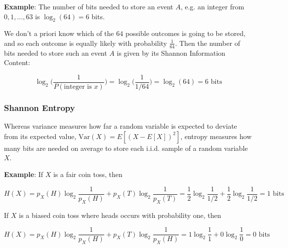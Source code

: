 \textbf{Example}: The number of bits needed to store an event $A$, e.g. an integer from $0, 1, \dots, 63$ is $\log_2(64) = 6$ bits.

We don't a priori know which of the $64$ possible outcomes is going to be stored, and so each outcome is equally likely with probability $\frac{1}{64}$. Then the number of bits needed to store such an event $A$ is given by its Shannon Information Content:

$$\log_2\Big( \frac{1}{P(\text{integer is } x)} \Big) = \log_2 \Big( \frac{1}{1 / 64} \Big) = \log_2(64) = 6 \text{ bits}$$

\subsubsection{Shannon Entropy}

Whereas variance measures how far a random variable is expected to deviate from its expected value, $\text{Var}(X) = E[(X - E[X])^2]$, entropy measures how many bits are needed on average to store each i.i.d. sample of a random variable $X$.


\textbf{Example}: If $X$ is a fair coin toss, then

$$H(X) = p_X(H) \log_2 \frac{1}{p_X(H)} + p_X(T) \log_2 \frac{1}{p_X(T)} = \frac{1}{2} \log_2 \frac{1}{1/2} + \frac{1}{2} \log_2 \frac{1}{1/2} = 1 \text{ bits}$$

If $X$ is a biased coin toss where heads occurs with probability one, then

$$H(X) = p_X(H) \log_2 \frac{1}{p_X(H)} + p_X(T) \log_2 \frac{1}{p_X(H)} = 1 \log_2 \frac{1}{1} + 0 \log_2 \frac{1}{0} = 0 \text{ bits}$$

